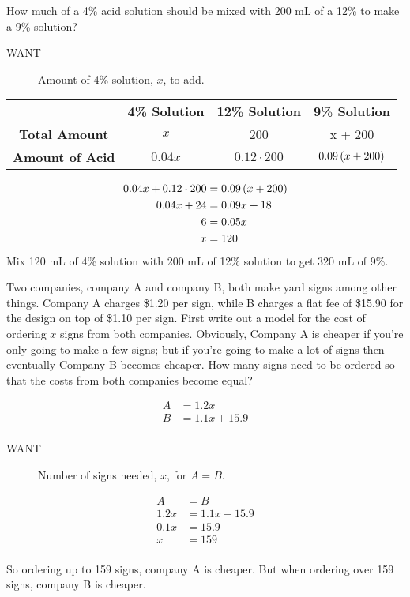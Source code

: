 \begin{example}
	How much of a 4\% acid solution should be mixed with 200 mL of a 
    12\% to make a 9\% solution?
	
	\begin{description}
		\item[WANT] Amount of 4\% solution, \(x\), to add.
	\end{description}
	\begin{center}
		\begin{tabular}{cccc}
			 & \textbf{4\% Solution} & \textbf{12\% Solution} & 
			 \textbf{9\% Solution} \\
			\textbf{Total Amount} & \(x\) & 200 & x + 200 \\
			\textbf{Amount of Acid} & \(0.04 x\) & \(0.12\cdot 200\) & 
             \(0.09\left( x + 200\right)\) \\
		\end{tabular}
	\end{center}
	\begin{align*}
		0.04 x + 0.12\cdot 200 & = 0.09\left( x + 200\right) \\
		0.04 x + 24 & = 0.09 x + 18 \\
		6 & = 0.05 x \\
		x & = 120 \\
	\end{align*}
	Mix 120 mL of 4\% solution with 200 mL of 12\% solution to get 320 
    mL of 9\%.
\end{example}

\begin{example}
	Two companies, company A and company B, both make yard signs among 
    other things. Company A charges \$1.20 per sign, while B charges a 
    flat fee of \$15.90 for the design on top of \$1.10 per sign. 
    First write out a model for the cost of ordering \(x\) signs from 
    both companies. Obviously, Company A is cheaper if you're only 
    going to make a few signs; but if you're going to make a lot of 
    signs then eventually Company B becomes cheaper. How many signs 
    need to be ordered so that the costs from both companies become 
    equal?
	
	\begin{align*}
		A & = 1.2 x \\
		B & = 1.1 x + 15.9 \\
	\end{align*}
	
	\begin{description}
		\item[WANT] Number of signs needed, \(x\), for \(A=B\).
	\end{description}
	\begin{align*}
		A & = B \\
		1.2 x & = 1.1 x + 15.9 \\
		0.1 x & = 15.9 \\
		x & = 159 \\
	\end{align*}
	
	So ordering up to 159 signs, company A is cheaper. But when ordering over 159 signs, company B is cheaper.
\end{example}

